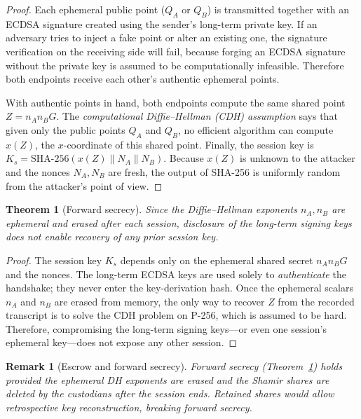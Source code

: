 \documentclass[pdflatex,sn-mathphys-num]{sn-jnl}%
\theoremstyle{thmstyleone}%
\newtheorem{theorem}{Theorem}%
\theoremstyle{thmstyletwo}%
\newtheorem{remark}{Remark}%
\theoremstyle{thmstylethree}%
\begin{document}
\begin{proof}
Each ephemeral public point ($Q_A$ or $Q_B$) is transmitted together with an ECDSA signature created using the sender's long-term private key. If an adversary tries to inject a fake point or alter an existing one, the signature verification on the receiving side will fail, because forging an ECDSA signature without the private key is assumed to be computationally infeasible. Therefore both endpoints receive each other's authentic ephemeral points.

With authentic points in hand, both endpoints compute the same shared point $Z=n_An_BG$. The \emph{computational Diffie--Hellman (CDH) assumption} says that given only the public points $Q_A$ and $Q_B$, no efficient algorithm can compute $x(Z)$, the $x$-coordinate of this shared point. Finally, the session key is $K_s=\mathrm{SHA\text{-}256}(x(Z)\|N_A\|N_B)$. Because $x(Z)$ is unknown to the attacker and the nonces $N_A,N_B$ are fresh, the output of SHA-256 is uniformly random from the attacker's point of view.
\end{proof}

\begin{theorem}[Forward secrecy]
\label{thm:fs}
Since the Diffie--Hellman exponents $n_A,n_B$ are ephemeral and erased after each session, disclosure of the long-term signing keys does not enable recovery of any prior session key.
\end{theorem}

\begin{proof}
The session key $K_s$ depends only on the ephemeral shared secret $n_An_BG$ and the nonces. The long-term ECDSA keys are used solely to \emph{authenticate} the handshake; they never enter the key-derivation hash. Once the ephemeral scalars $n_A$ and $n_B$ are erased from memory, the only way to recover $Z$ from the recorded transcript is to solve the CDH problem on P-256, which is assumed to be hard. Therefore, compromising the long-term signing keys---or even one session's ephemeral key---does not expose any other session.
\end{proof}

\begin{remark}[Escrow and forward secrecy]
Forward secrecy (Theorem~\ref{thm:fs}) holds provided the ephemeral DH exponents are erased and the Shamir shares are deleted by the custodians after the session ends. Retained shares would allow retrospective key reconstruction, breaking forward secrecy.
\end{remark}
\end{document}
